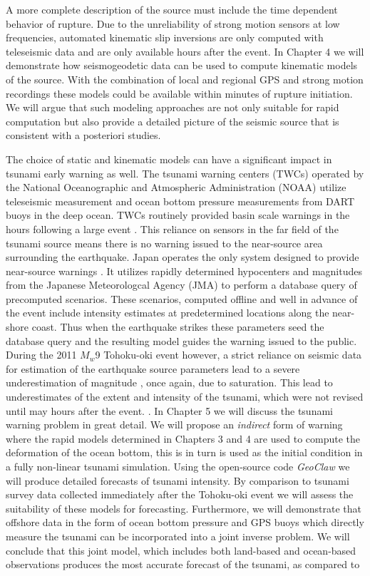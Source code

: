 A more complete description of the source must include the time dependent behavior of rupture. Due to the unreliability of strong motion sensors at low frequencies, automated kinematic slip inversions are only computed with teleseismic data \citep{ji2002} and are only available hours after the event. In Chapter 4 we will demonstrate how seismogeodetic data can be used to compute kinematic models of the source. With the combination of local and regional GPS and strong motion recordings these models could be available within minutes of rupture initiation. We will argue that such modeling approaches are not only suitable for rapid computation but also provide a detailed picture of the seismic source that is consistent with a posteriori studies.

The choice of static and kinematic models can have a significant impact in tsunami early warning as well. The tsunami warning centers (TWCs) operated by the National Oceanographic and Atmospheric Administration (NOAA) utilize teleseismic measurement and ocean bottom pressure measurements from DART buoys in the deep ocean. TWCs routinely provided basin scale warnings in the hours following a large event \citep{gonzalez2005,titov2005,mungov2013}. This reliance on sensors in the far field of the tsunami source means there is no warning issued to the near-source area surrounding the earthquake. Japan operates the only system designed to provide near-source warnings \citep{tatehata1997,ozaki2011}. It utilizes rapidly determined hypocenters and magnitudes from the Japanese Meteorologcal Agency (JMA) to perform a database query of precomputed scenarios. These scenarios, computed offline and well in advance of the event include intensity estimates at predetermined locations along the near-shore coast. Thus when the earthquake strikes these parameters seed the database query and the resulting model guides the warning issued to the public. During the 2011 $M_w$9 Tohoku-oki event however, a strict reliance on seismic data for estimation of the earthquake source parameters lead to a severe underestimation of magnitude \citep{hoshiba2011}, once again, due to saturation. This lead to underestimates of the extent and intensity of the tsunami, which were not revised until may hours after the event. \citep{ozaki2011}. In Chapter 5 we will discuss the tsunami warning problem in great detail. We will propose an \textit{indirect} form of warning where the rapid models determined in Chapters 3 and 4 are used to compute the deformation of the ocean bottom, this is in turn is used as the initial condition in a  fully non-linear tsunami simulation. Using the open-source code \textit{GeoClaw} \citep{leveque2011} we will produce detailed forecasts of tsunami intensity. By comparison to tsunami survey data collected immediately after the Tohoku-oki event \citep{mori2011,mori2012} we will assess the suitability of these models for forecasting. Furthermore, we will demonstrate that offshore data in the form of ocean bottom pressure and GPS buoys which directly measure the tsunami can be incorporated into a joint inverse problem. We will conclude that this joint model, which includes both land-based and ocean-based observations produces the most accurate forecast of the tsunami, as compared to 
